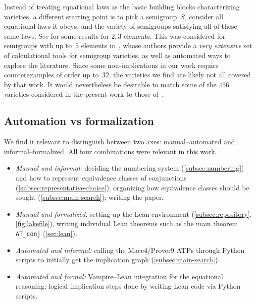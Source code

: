 \documentclass[12pt]{amsart}
\theoremstyle{plain}
\theoremstyle{definition}
\begin{document}
Instead of treating equational laws as the basic building blocks characterizing varieties, a different starting point is to pick a semigroup~$S$, consider all equational laws it obeys, and the variety of semigroups satisfying all of these same laws.  See \cite{luo2011variety} for some results for $2,3$ elements.
This was considered for semigroups with up to~$5$ elements in~\cite{ARAUJO2023698}, whose authors provide a \emph{very extensive} set of calculational tools for semigroup varieties, as well as automated ways to explore the literature.
Since some non-implications in our work require counterexamples of order up to~$32$, the varieties we find are likely not all covered by that work.  It would nevertheless be desirable to match some of the $456$ varieties considered in the present work to those of~\cite{luo2011variety,ARAUJO2023698}.

\subsection{Automation vs formalization}
\label{subsec:auto-vs-form}

We find it relevant to distinguish between two axes: manual--automated and informal--formalized.  All four combinations were relevant in this work.
\begin{itemize}
\item \textit{Manual and informal:} deciding the numbering system (\autoref{subsec:numbering}) and how to represent equivalence classes of conjunctions (\autoref{subsec:representative-choice}); organizing how equivalence classes should be sought (\autoref{subsec:main-search}); writing the paper.

\item \textit{Manual and formalized:} setting up the Lean environment (\autoref{subsec:repository}, \autoref{fig:lakefile}), writing individual Lean theorems such as the main theorem \texttt{AT\_conj} (\autoref{sec:lean}).

\item \textit{Automated and informal:} calling the Mace4/Prover9 ATPs through Python scripts to initially get the implication graph (\autoref{subsec:main-search}).

\item \textit{Automated and formal:} Vampire--Lean integration for the equational reasoning; logical implication steps done by writing Lean code via Python scripts.
\end{itemize}

\end{document}
